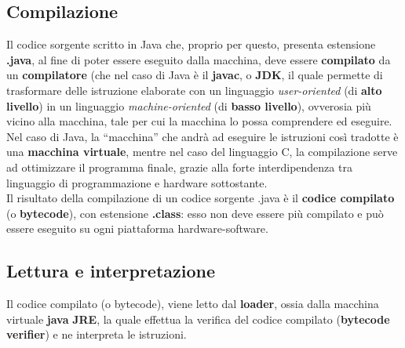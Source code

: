 \documentclass[a4paper]{extarticle}
\newcommand{\quotes}[1]{``#1''}
\begin{document}
\vspace{1em}
\subsection{Compilazione}
Il codice sorgente scritto in Java che, proprio per questo, presenta estensione \textbf{.java}, al fine di poter essere eseguito dalla macchina, deve essere \textbf{compilato} da un \textbf{compilatore} (che nel caso di Java è il \textbf{javac}, o \textbf{JDK}, il quale permette di trasformare delle istruzione elaborate con un linguaggio \emph{user-oriented} (di \textbf{alto livello}) in un linguaggio \emph{machine-oriented} (di \textbf{basso livello}), ovverosia più vicino alla macchina, tale per cui la macchina lo possa comprendere ed eseguire. Nel caso di Java, la \quotes{macchina} che andrà ad eseguire le istruzioni così tradotte è una \textbf{macchina virtuale}, mentre nel caso del linguaggio C, la compilazione serve ad ottimizzare il programma finale, grazie alla forte interdipendenza tra linguaggio di programmazione e hardware sottostante.\\
Il risultato della compilazione di un codice sorgente .java è il \textbf{codice compilato} (o \textbf{bytecode}), con estensione \textbf{.class}: esso non deve essere più compilato e può essere eseguito su ogni piattaforma hardware-software.

\vspace{1em}
\subsection{Lettura e interpretazione}
Il codice compilato (o bytecode), viene letto dal \textbf{loader}, ossia dalla macchina virtuale \textbf{java} \textbf{JRE}, la quale effettua la verifica del codice compilato (\textbf{bytecode verifier}) e ne interpreta le istruzioni.

\vspace{1em}
\end{document}
